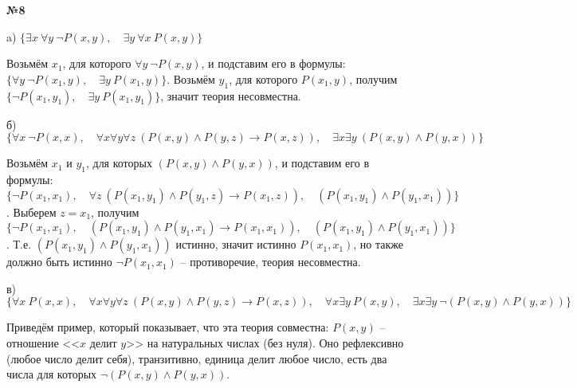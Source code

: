 \documentclass{article}
\newenvironment{task}{\begin{center}\fontsize{14}{14}\selectfont\bf}{\rm\fontsize{12}{12}\selectfont\end{center}}
\begin{document}
	
	\begin{task} 
		№8
	\end{task}
	\begin{center}
		a) $\lbrace \exists x\ \forall y\ \neg P(x, y), \quad \exists y\ \forall x\ P(x, y)\rbrace$
	\end{center}
	Возьмём $x_1$, для которого $\forall y\ \neg P(x, y)$, и подставим его в формулы: $\lbrace \forall y\ \neg P(x_1, y), \quad \exists y\ P(x_1, y)\rbrace$. Возьмём $y_1$, для которого $P(x_1, y)$, получим $\lbrace \neg P(x_1, y_1), \quad \exists y\ P(x_1, y_1)\rbrace$, значит теория несовместна.
	
	\begin{center}
		б) $\lbrace \forall x\ \neg P(x, x), \quad \forall x\forall y\forall z\ (P(x, y)\wedge P(y, z) \rightarrow P(x, z)), \quad \exists x\exists y\ (P(x, y) \wedge P(y, x))\rbrace$
	\end{center}
	Возьмём $x_1$ и $y_1$, для которых $(P(x, y) \wedge P(y, x))$, и подставим его в формулы: $\lbrace \neg P(x_1, x_1), \quad \forall z\ (P(x_1, y_1)\wedge P(y_1, z) \rightarrow P(x_1, z)), \quad (P(x_1, y_1) \wedge P(y_1, x_1))\rbrace$. Выберем $z = x_1$, получим $\lbrace \neg P(x_1, x_1), \quad (P(x_1, y_1)\wedge P(y_1, x_1) \rightarrow P(x_1, x_1)), \quad (P(x_1, y_1) \wedge P(y_1, x_1))\rbrace$. Т.е. $(P(x_1, y_1) \wedge P(y_1, x_1))$ истинно, значит истинно $P(x_1, x_1)$, но также должно быть истинно $\neg P(x_1, x_1)$ -- противоречие, теория несовместна.
	
	\begin{center}
		в) $\lbrace 
		\forall x\ P(x, x), \quad
		\forall x\forall y\forall z\ (P(x, y)\wedge P(y, z) \rightarrow P(x, z)), \quad
		\forall x\exists y\ P(x, y), \quad
		\exists x\exists y\ \neg(P(x, y) \wedge P(y, x))
		\rbrace$
	\end{center}
	Приведём пример, который показывает, что эта теория совместна: $P(x, y)$ -- отношение <<$x$ делит $y$>> на натуральных числах (без нуля). Оно рефлексивно (любое число делит себя), транзитивно, единица делит любое число, есть два числа для которых $\neg(P(x, y) \wedge P(y, x))$.
		
	
		
\end{document}
